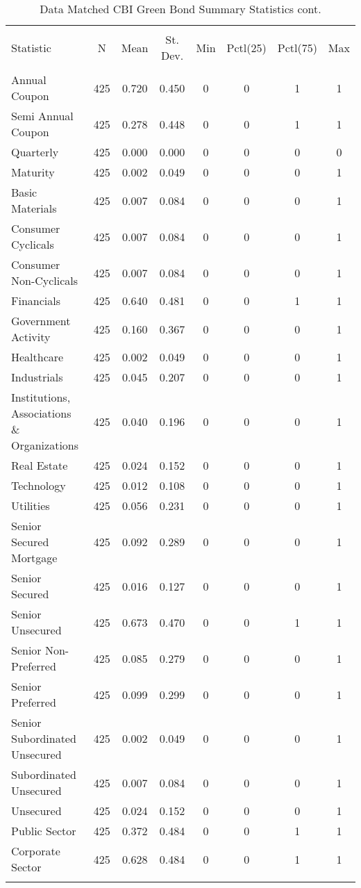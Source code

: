 \begin{table}[!htbp] \centering
  \footnotesize
  \caption{Data Matched CBI Green Bond Summary Statistics cont.} 
  \label{} 
\begin{tabular}{@{\extracolsep{5pt}}lccccccc} 
\\[-1.8ex]\hline 
\hline \\[-1.8ex] 
Statistic & \multicolumn{1}{c}{N} & \multicolumn{1}{c}{Mean} & \multicolumn{1}{c}{St. Dev.} & \multicolumn{1}{c}{Min} & \multicolumn{1}{c}{Pctl(25)} & \multicolumn{1}{c}{Pctl(75)} & \multicolumn{1}{c}{Max} \\ 
\hline \\[-1.8ex] 
Annual Coupon & 425 & 0.720 & 0.450 & 0 & 0 & 1 & 1 \\ 
Semi Annual Coupon & 425 & 0.278 & 0.448 & 0 & 0 & 1 & 1 \\ 
Quarterly & 425 & 0.000 & 0.000 & 0 & 0 & 0 & 0 \\ 
Maturity & 425 & 0.002 & 0.049 & 0 & 0 & 0 & 1 \\ 
Basic Materials & 425 & 0.007 & 0.084 & 0 & 0 & 0 & 1 \\ 
Consumer Cyclicals & 425 & 0.007 & 0.084 & 0 & 0 & 0 & 1 \\ 
Consumer Non-Cyclicals & 425 & 0.007 & 0.084 & 0 & 0 & 0 & 1 \\ 
Financials & 425 & 0.640 & 0.481 & 0 & 0 & 1 & 1 \\ 
Government Activity & 425 & 0.160 & 0.367 & 0 & 0 & 0 & 1 \\ 
Healthcare & 425 & 0.002 & 0.049 & 0 & 0 & 0 & 1 \\ 
Industrials & 425 & 0.045 & 0.207 & 0 & 0 & 0 & 1 \\ 
Institutions, Associations \& Organizations & 425 & 0.040 & 0.196 & 0 & 0 & 0 & 1 \\ 
Real Estate & 425 & 0.024 & 0.152 & 0 & 0 & 0 & 1 \\ 
Technology & 425 & 0.012 & 0.108 & 0 & 0 & 0 & 1 \\ 
Utilities & 425 & 0.056 & 0.231 & 0 & 0 & 0 & 1 \\ 
Senior Secured Mortgage & 425 & 0.092 & 0.289 & 0 & 0 & 0 & 1 \\ 
Senior Secured & 425 & 0.016 & 0.127 & 0 & 0 & 0 & 1 \\ 
Senior Unsecured & 425 & 0.673 & 0.470 & 0 & 0 & 1 & 1 \\ 
Senior Non-Preferred & 425 & 0.085 & 0.279 & 0 & 0 & 0 & 1 \\ 
Senior Preferred & 425 & 0.099 & 0.299 & 0 & 0 & 0 & 1 \\ 
Senior Subordinated Unsecured & 425 & 0.002 & 0.049 & 0 & 0 & 0 & 1 \\ 
Subordinated Unsecured & 425 & 0.007 & 0.084 & 0 & 0 & 0 & 1 \\ 
Unsecured & 425 & 0.024 & 0.152 & 0 & 0 & 0 & 1 \\ 
Public Sector & 425 & 0.372 & 0.484 & 0 & 0 & 1 & 1 \\ 
Corporate Sector & 425 & 0.628 & 0.484 & 0 & 0 & 1 & 1 \\ 
\hline \\[-1.8ex] 
\end{tabular} 
\end{table} 

